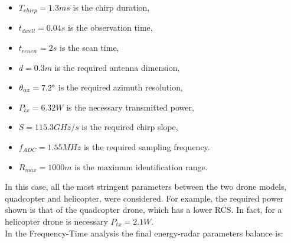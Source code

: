 \begin{itemize}

    \item $T_{chirp} = 1.3ms$ is the chirp duration,
    
    \item $t_{dwell} = 0.04s$ is the observation time,
    
    \item $t_{renew} = 2 s$ is the scan time,

    \item $d = 0.3 m$ is the required antenna dimension,
         
    \item $\theta_{az} = 7.2\degree$ is the required azimuth resolution,

    \item $P_{tx} = 6.32 W$ is the necessary transmitted power,
    
    \item $S = 115.3 GHz/s$ is the required chirp slope,
    
    \item $f_{ADC} = 1.55 MHz$ is the required sampling frequency.
    
    \item $R_{max} = 1000 m$ is the maximum identification range.

    
\end{itemize}

In this case, all the most stringent parameters between the two drone models, quadcopter and helicopter, were considered. For example, the required power shown is that of the quadcopter drone, which has a lower RCS. In fact, for a helicopter drone is necessary $P_{tx} = 2.1 W$.\\
In the Frequency-Time analysis the final energy-radar parameters balance is:

